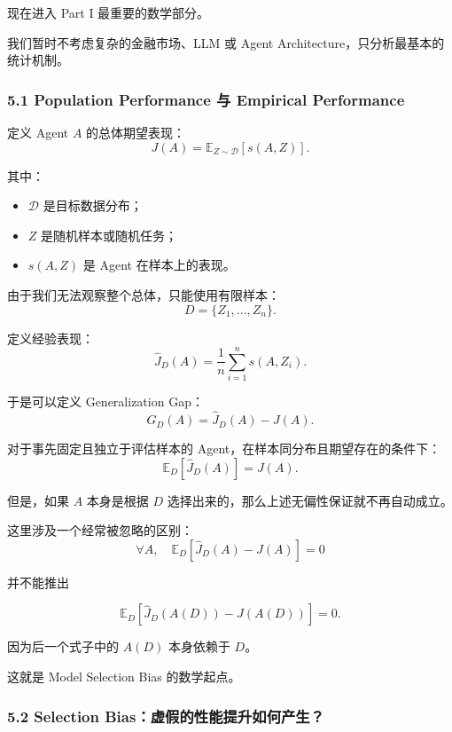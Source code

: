 现在进入 Part I 最重要的数学部分。

我们暂时不考虑复杂的金融市场、LLM 或 Agent Architecture，只分析最基本的统计机制。

\hypertarget{part-1-07-0001-population-performance-ux4e0e-empirical-performance}{%
\subsubsection{5.1 Population Performance 与 Empirical Performance}\label{part-1-07-0001-population-performance-ux4e0e-empirical-performance}}

定义 Agent \(A\) 的总体期望表现：
\[J(A)=
\mathbb E_{Z\sim\mathcal D}
[s(A,Z)].\]

其中：

\begin{itemize}
\tightlist
\item
  \(\mathcal D\) 是目标数据分布；
\item
  \(Z\) 是随机样本或随机任务；
\item
  \(s(A,Z)\) 是 Agent 在样本上的表现。
\end{itemize}

由于我们无法观察整个总体，只能使用有限样本：
\[D=\{Z_1,\ldots,Z_n\}.\]

定义经验表现：
\[\widehat J_D(A)
=
\frac1n\sum_{i=1}^{n}s(A,Z_i).\]

于是可以定义 Generalization Gap：
\[G_D(A)
=
\widehat J_D(A)-J(A).\]

对于事先固定且独立于评估样本的 Agent，在样本同分布且期望存在的条件下：
\[\mathbb E_D[\widehat J_D(A)]
=
J(A).\]

但是，如果 \(A\) 本身是根据 \(D\) 选择出来的，那么上述无偏性保证就不再自动成立。

这里涉及一个经常被忽略的区别：
\[\forall A,\quad
\mathbb E_D[\widehat J_D(A)-J(A)]=0\]

并不能推出

\[\mathbb E_D
\left[
\widehat J_D(A(D))-J(A(D))
\right]=0.\]

因为后一个式子中的 \(A(D)\) 本身依赖于 \(D\)。

这就是 Model Selection Bias 的数学起点。

\hypertarget{part-1-07-0001-selection-biasux865aux5047ux7684ux6027ux80fdux63d0ux5347ux5982ux4f55ux4ea7ux751f}{%
\subsubsection{5.2 Selection Bias：虚假的性能提升如何产生？}\label{part-1-07-0001-selection-biasux865aux5047ux7684ux6027ux80fdux63d0ux5347ux5982ux4f55ux4ea7ux751f}}

